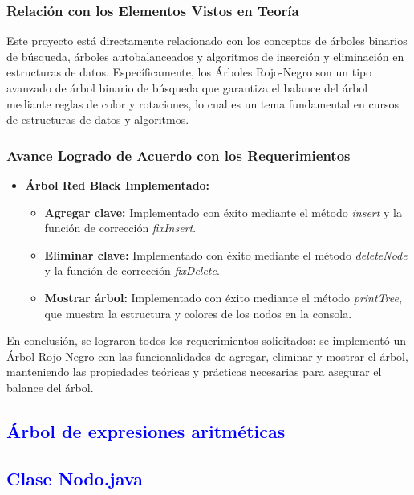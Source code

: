 \documentclass[12pt]{article}
\begin{document}
\subsubsection{Relación con los Elementos Vistos en Teoría}

Este proyecto está directamente relacionado con los conceptos de árboles binarios de búsqueda, árboles autobalanceados y algoritmos de inserción y eliminación en estructuras de datos. Específicamente, los Árboles Rojo-Negro son un tipo avanzado de árbol binario de búsqueda que garantiza el balance del árbol mediante reglas de color y rotaciones, lo cual es un tema fundamental en cursos de estructuras de datos y algoritmos.

\subsubsection{Avance Logrado de Acuerdo con los Requerimientos}

\begin{itemize}
    \item \textbf{Árbol Red Black Implementado:}
    \begin{itemize}
        \item \textbf{Agregar clave:} Implementado con éxito mediante el método \textit{insert} y la función de corrección \textit{fixInsert}.
        \item \textbf{Eliminar clave:} Implementado con éxito mediante el método \textit{deleteNode} y la función de corrección \textit{fixDelete}.
        \item \textbf{Mostrar árbol:} Implementado con éxito mediante el método \textit{printTree}, que muestra la estructura y colores de los nodos en la consola.
    \end{itemize}
\end{itemize}

En conclusión, se lograron todos los requerimientos solicitados: se implementó un Árbol Rojo-Negro con las funcionalidades de agregar, eliminar y mostrar el árbol, manteniendo las propiedades teóricas y prácticas necesarias para asegurar el balance del árbol.

\subsection*{\textcolor{blue}{Árbol de expresiones aritméticas }}

\subsection{\textcolor{blue}{Clase Nodo.java}}
\end{document}
